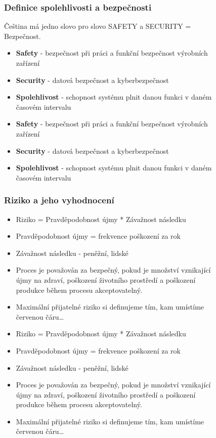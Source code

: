 \begin{figure}[h]
\subsubsection*{Definice spolehlivosti a bezpečnosti}
Čeština má jedno slovo pro slovo SAFETY a SECURITY = Bezpečnost.
\begin{itemize}
  \item \textbf{Safety} - bezpečnost při práci a funkční bezpečnost výrobních zařízení
  \item \textbf{Security} - datová bezpečnost a kyberbezpečnost
  \item \textbf{Spolehlivost} - schopnost systému plnit danou funkci v daném časovém intervalu
    \item \textbf{Safety} - bezpečnost při práci a funkční bezpečnost výrobních zařízení
    \item \textbf{Security} - datová bezpečnost a kyberbezpečnost
    \item \textbf{Spolehlivost} - schopnost systému plnit danou funkci v daném časovém intervalu
\end{itemize}

\subsubsection*{Riziko a jeho vyhodnocení}
\begin{itemize}
  \item Riziko = Pravděpodobnost újmy * Závažnost následku
  \item Pravděpodobnost újmy = frekvence poškození za rok
  \item Závažnost následku - peněžní, lidské
  \item Proces je považován za bezpečný, pokud je množství vznikající újmy na zdraví, poškození životního prostředí a poškození produkce během procesu akceptovatelný.
  \item Maximální přijatelné riziko si definujeme tím, kam umístíme červenou čáru\dots
    \item Riziko = Pravděpodobnost újmy * Závažnost následku
    \item Pravděpodobnost újmy = frekvence poškození za rok
    \item Závažnost následku - peněžní, lidské
    \item Proces je považován za bezpečný, pokud je množství vznikající újmy na zdraví, poškození životního prostředí a poškození produkce během procesu akceptovatelný.
    \item Maximální přijatelné riziko si definujeme tím, kam umístíme červenou čáru\dots
\end{itemize}


\end{figure}
